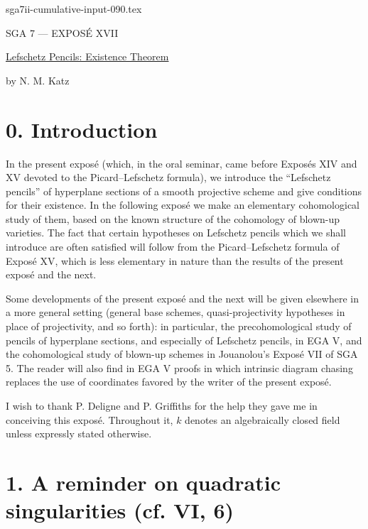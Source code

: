 \begin{filecontents*}{sga7ii-cumulative-input-090.tex}
\clearpage
\begin{center}
{\large SGA 7 --- EXPOS\'E XVII}\par
\vspace{2em}
{\Large\underline{Lefschetz Pencils: Existence Theorem}}\par
\vspace{1.5em}
{\large by N. M. Katz}
\end{center}

\section*{0. Introduction}

In the present expos\'e (which, in the oral seminar, came before
Expos\'es XIV and XV devoted to the Picard--Lefschetz formula), we
introduce the ``Lefschetz pencils'' of hyperplane sections of a smooth
projective scheme and give conditions for their existence.  In the
following expos\'e we make an elementary cohomological study of them,
based on the known structure of the cohomology of blown-up varieties.
The fact that certain hypotheses on Lefschetz pencils which we shall
introduce are often satisfied will follow from the Picard--Lefschetz
formula of Expos\'e XV, which is less elementary in nature than the
results of the present expos\'e and the next.

Some developments of the present expos\'e and the next will be given
elsewhere in a more general setting (general base schemes,
quasi-projectivity hypotheses in place of projectivity, and so forth):
in particular, the precohomological study of pencils of hyperplane
sections, and especially of Lefschetz pencils, in EGA V, and the
cohomological study of blown-up schemes in Jouanolou's Expos\'e VII of
SGA 5.  The reader will also find in EGA V proofs in which intrinsic
diagram chasing replaces the use of coordinates favored by the writer
of the present expos\'e.

I wish to thank P. Deligne and P. Griffiths for the help they gave me
in conceiving this expos\'e.  Throughout it, $k$ denotes an
algebraically closed field unless expressly stated otherwise.

\section*{1. A reminder on quadratic singularities (cf. VI, 6)}


\end{filecontents*}
